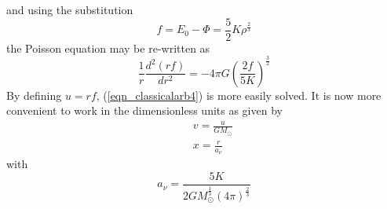 and using the substitution
\begin{equation}
	f = E_0 - \Phi = \frac{5}{2} K \rho^{\frac{2}{3}}
	\label{eqn_classicalarb3}
\end{equation}
the Poisson equation may be re-written as
\begin{equation}
	\frac{1}{r}\frac{d^2(rf)}{dr^2} = -4 \pi G \left(\frac{2f}{5K}\right)^{\frac{3}{2}}
	\label{eqn_classicalarb4}
\end{equation}
By defining $u = rf$, (\ref{eqn_classicalarb4}) is more easily solved. It is now more convenient to work in the dimensionless
units as given by
\begin{eqnarray}
	&&v = \frac{u}{GM_\odot}
	\label{eqn_classicalv} \\
	&&x = \frac{r}{a_\nu}
	\label{eqn_classicalx}
\end{eqnarray}
with
\begin{equation}
	a_{\nu} = \frac{5K}{2G M_\odot^\frac{1}{3} (4\pi)^\frac{2}{3}}
	\label{eqn_classicalanu}
\end{equation}

